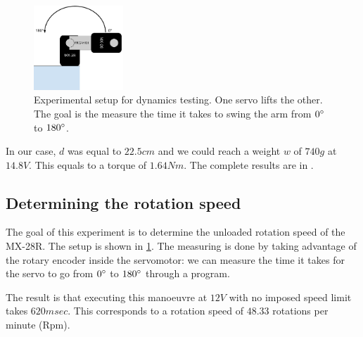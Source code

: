 \begin{figure}[htp]
\centering
    \includegraphics[width = 0.3\textwidth]{figures/exp2}
    \caption[Experimental setup dynamics testing]{Experimental setup for dynamics testing. One servo lifts the other. The goal is the measure the time it takes to swing the arm from $0\degree$ to $180\degree$.}
    \label{fig:exp2}
\end{figure}

In our case, $d$ was equal to $22.5cm$ and we could reach a weight $w$ of $740g$ at $14.8V$. This equals to a torque of $1.64Nm$. The complete results are in .

\subsection{Determining the rotation speed}
The goal of this experiment is to determine the unloaded rotation speed of the MX-28R. The setup is shown in \cref{fig:exp2}. The measuring is done by taking advantage of the rotary encoder inside the servomotor: we can measure the time it takes for the servo to go from $0\degree$ to $180\degree$ through a program.

The result is that executing this manoeuvre at $12V$ with no imposed speed limit takes $620msec$. This corresponds to a rotation speed of $48.33$ rotations per minute (Rpm).


